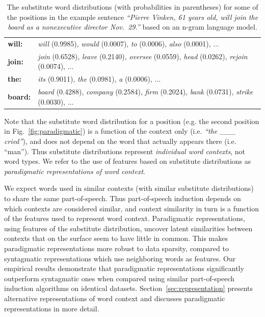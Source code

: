 \begin{table}[b]
\caption{The substitute word distributions (with probabilities in
  parentheses) for some of the positions in the example sentence
  \textit{``Pierre Vinken, 61 years old, will join the board as a
    nonexecutive director Nov.~29.''} based on an n-gram language
  model.}
\label{tab:subdist}
\begin{tabular}{|ll|} \hline
\textbf{will:} & \textit{will} (0.9985), \textit{would} (0.0007), \textit{to} (0.0006), \textit{also} (0.0001), $\ldots$ \\
\textbf{join:} & \textit{join} (0.6528), \textit{leave} (0.2140), \textit{oversee} (0.0559), \textit{head} (0.0262), \textit{rejoin} (0.0074), $\ldots$ \\
\textbf{the:}  &\textit{its} (0.9011), \textit{the} (0.0981), \textit{a} (0.0006), $\ldots$ \\
\textbf{board:} & \textit{board} (0.4288), \textit{company} (0.2584), \textit{firm} (0.2024), \textit{bank} (0.0731), \textit{strike} (0.0030), $\ldots$ \\
\hline
\end{tabular}
\end{table}

Note that the substitute word distribution for a position (e.g. the
second position in Fig.~\ref{fig:paradigmatic}) is a function of the
context only (i.e. \textit{``the \_\_\_ cried''}), and does not depend
on the word that actually appears there (i.e. ``man'').  Thus
substitute distributions represent {\em individual word contexts}, not
word types.  We refer to the use of features based on substitute
distributions as {\em paradigmatic representations of word context}.

We expect words used in similar contexts (with similar substitute
distributions) to share the same part-of-speech.  Thus part-of-speech
induction depends on which contexts are considered similar, and
context similarity in turn is a function of the features used to
represent word context.  Paradigmatic representations, using features
of the substitute distribution, uncover latent similarities between
contexts that on the surface seem to have little in common.  This
makes paradigmatic representations more robust to data sparsity,
compared to syntagmatic representations which use neighboring words as
features.  Our empirical results demonstrate that paradigmatic
representations significantly outperform syntagmatic ones when
compared using similar part-of-speech induction algorithms on
identical datasets.  Section~\ref{sec:representation} presents
alternative representations of word context and discusses paradigmatic
representations in more detail.

